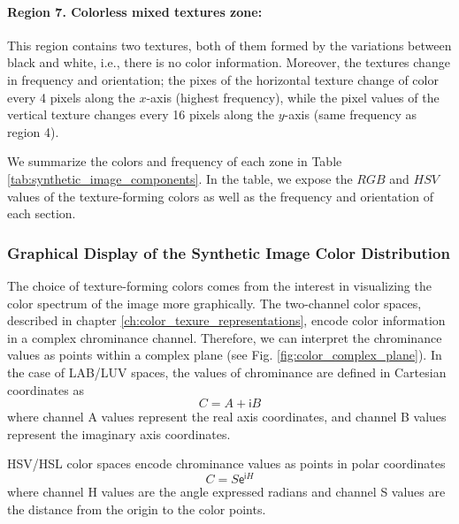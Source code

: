 \documentclass[journal]{IEEEtran}
\begin{document}
\paragraph{Region 7. Colorless mixed textures zone:}
This region contains two textures, both of them formed by the variations between black and white, i.e., there is no color information. Moreover, the textures change in frequency and orientation; the pixes of the horizontal texture change of color every 4 pixels along the $x$-axis (highest frequency), while the pixel values of the vertical texture changes every 16 pixels along the $y$-axis (same frequency as region 4).

We summarize the colors and frequency of each zone in Table \ref{tab:synthetic_image_components}. In the table, we expose the $RGB$ and $HSV$ values of the texture-forming colors as well as the frequency and orientation of each section.

\subsubsection{Graphical Display of the Synthetic Image Color Distribution}
The choice of texture-forming colors comes from the interest in visualizing the color spectrum of the image more graphically. The two-channel color spaces, described in chapter \ref{ch:color_texure_representations}, encode color information in a complex chrominance channel. Therefore, we can interpret the chrominance values as points within a complex plane (see Fig. \ref{fig:color_complex_plane}). In the case of LAB/LUV spaces, the values of chrominance are defined in Cartesian coordinates as 
\begin{equation}\label{eq:chrominance_lab2}
    C = A + \mathsf{i}B
\end{equation}
where channel A values represent the real axis coordinates, and channel B values represent the imaginary axis coordinates. 

HSV/HSL color spaces encode chrominance values as points in polar coordinates 
\begin{equation}\label{eq:chrominance_hsv2}
    C = S \mathsf{e}^{\mathsf{i}H}
\end{equation}
where channel H values are the angle expressed radians and channel S values are the distance from the origin to the color points.
\end{document}
